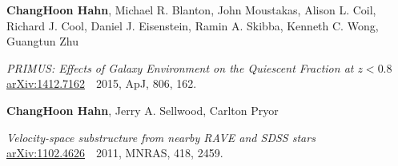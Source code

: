 \documentclass[10pt]{article} %
\begin{document}
{\bf ChangHoon Hahn}, Michael R. Blanton, John Moustakas, Alison L. Coil, Richard J. Cool, Daniel J. Eisenstein, Ramin A. Skibba, Kenneth C. Wong, Guangtun Zhu\\
\begin{addmargin}[1em]{0em}
{\it PRIMUS: Effects of Galaxy Environment on the Quiescent Fraction at $z < 0.8$}\\
\href{http://arxiv.org/abs/1412.7162}{arXiv:1412.7162}~~2015, ApJ, 806, 162.\\[5pt]
\end{addmargin}

{\bf ChangHoon Hahn}, Jerry A. Sellwood, Carlton Pryor \\
\begin{addmargin}[1em]{0em}
{\it Velocity-space substructure from nearby RAVE and SDSS stars}\\
\href{http://arxiv.org/abs/1102.4626}{arXiv:1102.4626}~~2011, MNRAS, 418, 2459. 
\end{addmargin}
\vspace{-0.25cm}




\end{document}
